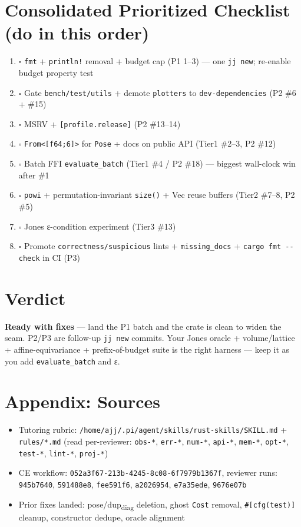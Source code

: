 \documentclass[11pt]{article}
\begin{document}
\section{Consolidated Prioritized Checklist (do in this order)}
\label{sec:org6f5277f}
\begin{enumerate}
\item{$\square$} \texttt{fmt} + \texttt{println!} removal + budget cap (P1 1–3) — one \texttt{jj new}; re-enable budget property test
\item{$\square$} Gate \texttt{bench/test/utils} + demote \texttt{plotters} to \texttt{dev-dependencies} (P2 \#6 + \#15)
\item{$\square$} MSRV + \texttt{[profile.release]} (P2 \#13–14)
\item{$\square$} \texttt{From<[f64;6]>} for \texttt{Pose} + docs on public API (Tier1 \#2–3, P2 \#12)
\item{$\square$} Batch FFI \texttt{evaluate\_batch} (Tier1 \#4 / P2 \#18) — biggest wall-clock win after \#1
\item{$\square$} \texttt{powi} + permutation-invariant \texttt{size()} + Vec reuse buffers (Tier2 \#7–8, P2 \#5)
\item{$\square$} Jones ε-condition experiment (Tier3 \#13)
\item{$\square$} Promote \texttt{correctness/suspicious} lints + \texttt{missing\_docs} + \texttt{cargo fmt -{}-{}check} in CI (P3)
\end{enumerate}
\section{Verdict}
\label{sec:org1c6e9c7}
\textbf{Ready with fixes} — land the P1 batch and the crate is clean to widen the seam. P2/P3 are follow-up \texttt{jj new} commits. Your Jones oracle + volume/lattice + affine-equivariance + prefix-of-budget suite is the right harness — keep it as you add \texttt{evaluate\_batch} and ε.
\section{Appendix: Sources}
\label{sec:org175794a}
\begin{itemize}
\item Tutoring rubric: \texttt{/home/ajj/.pi/agent/skills/rust-skills/SKILL.md} + \texttt{rules/*.md} (read per-reviewer: \texttt{obs-*}, \texttt{err-*}, \texttt{num-*}, \texttt{api-*}, \texttt{mem-*}, \texttt{opt-*}, \texttt{test-*}, \texttt{lint-*}, \texttt{proj-*})
\item CE workflow: \texttt{052a3f67-213b-4245-8c08-6f7979b1367f}, reviewer runs: \texttt{945b7640}, \texttt{591488e8}, \texttt{fee591f6}, \texttt{a2026954}, \texttt{e7a35ede}, \texttt{9676e07b}
\item Prior fixes landed: pose/dup\textsubscript{diag} deletion, ghost \texttt{Cost} removal, \texttt{\#[cfg(test)]} cleanup, constructor dedupe, oracle alignment
\end{itemize}
\end{document}
